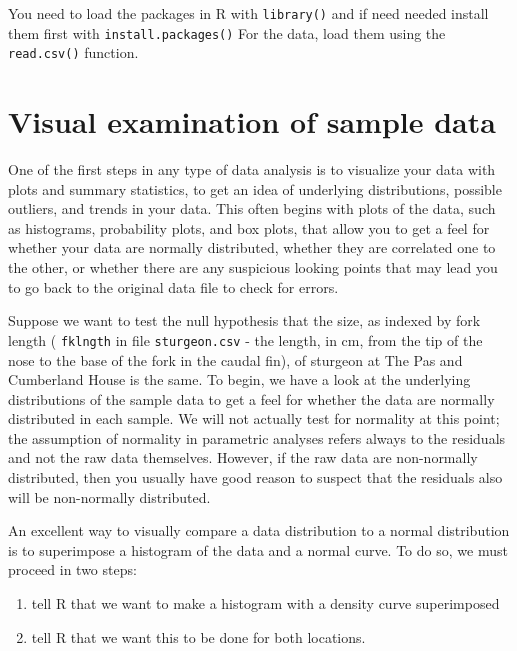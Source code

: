 \documentclass[
  12pt,
]{book}
\providecommand{\tightlist}{%
  \setlength{\itemsep}{0pt}\setlength{\parskip}{0pt}}
\begin{document}
You need to load the packages in R with \texttt{library()} and if need needed install them first with \texttt{install.packages()}
For the data, load them using the \texttt{read.csv()} function.

\hypertarget{visual-examination-of-sample-data}{%
\section{Visual examination of sample data}\label{visual-examination-of-sample-data}}

One of the first steps in any type of data analysis is to visualize your data with plots and summary statistics, to get an idea of underlying distributions, possible outliers, and trends in your data. This often begins with plots of the data, such as histograms, probability plots, and box plots, that allow you to get a feel for whether your data are normally distributed, whether they are correlated one to the other, or whether there are any suspicious looking points that may lead you to go back to the original data file to check for errors.

Suppose we want to test the null hypothesis that the size, as indexed by fork length ( \texttt{fklngth} in file \texttt{sturgeon.csv} - the length, in cm, from the tip of the nose to the base of the fork in the caudal fin), of sturgeon at The Pas and Cumberland House is the same. To begin, we have a look at the underlying distributions of the sample data to get a feel for whether the data are normally distributed in each sample. We will not actually test for normality at this point; the assumption of normality in parametric analyses refers always to the residuals and not the raw data themselves. However, if the raw data are non-normally distributed, then you usually have good reason to suspect that the residuals also will be non-normally distributed.

An excellent way to visually compare a data distribution to a normal distribution is to superimpose a histogram of the data and a normal curve. To do so, we must proceed in two steps:

\begin{enumerate}
\def\labelenumi{\arabic{enumi}.}
\tightlist
\item
  tell R that we want to make a histogram with a density curve superimposed
\item
  tell R that we want this to be done for both locations.
\end{enumerate}
\end{document}
